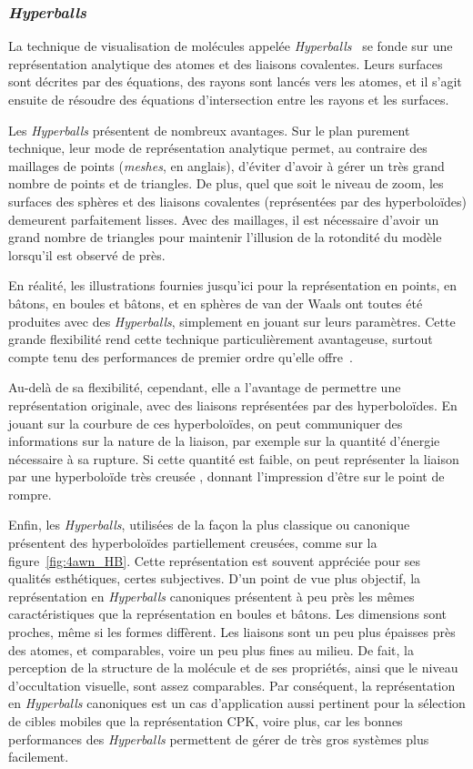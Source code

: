 \begin{appendices}
	\subsubsection{\emph{Hyperballs}} La technique de visualisation de molécules appelée \emph{Hyperballs}~\cite{chavent2011gpu} se fonde sur une représentation analytique des atomes et des liaisons covalentes. Leurs surfaces sont décrites par des équations, des rayons sont lancés vers les atomes, et il s'agit ensuite de résoudre des équations d'intersection entre les rayons et les surfaces.
		
	Les \emph{Hyperballs} présentent de nombreux avantages. Sur le plan purement technique, leur mode de représentation analytique permet, au contraire des maillages de points (\emph{meshes}, en anglais), d'éviter d'avoir à gérer un très grand nombre de points et de triangles. De plus, quel que soit le niveau de zoom, les surfaces des sphères et des liaisons covalentes (représentées par des hyperboloïdes) demeurent parfaitement lisses. Avec des maillages, il est nécessaire d'avoir un grand nombre de triangles pour maintenir l'illusion de la rotondité du modèle lorsqu'il est observé de près.
	
	En réalité, les illustrations fournies jusqu'ici pour la représentation en points, en bâtons, en boules et bâtons, et en sphères de van der Waals ont toutes été produites avec des \emph{Hyperballs}, simplement en jouant sur leurs paramètres. Cette grande flexibilité rend cette technique particulièrement avantageuse, surtout compte tenu des performances de premier ordre qu'elle offre~\cite{chavent2011gpu}.
		
	Au-delà de sa flexibilité, cependant, elle a l'avantage de permettre une représentation originale, avec des liaisons représentées par des hyperboloïdes. En jouant sur la courbure de ces hyperboloïdes, on peut communiquer des informations sur la nature de la liaison, par exemple sur la quantité d'énergie nécessaire à sa rupture. Si cette quantité est faible, on peut représenter la liaison par une hyperboloïde très \og creusée \fg{}, donnant l'impression d'être sur le point de rompre.
		
	Enfin, les \emph{Hyperballs}, utilisées de la façon la plus \og classique \fg{} ou \og canonique \fg{} présentent des hyperboloïdes partiellement creusées, comme sur la figure~\ref{fig:4awn_HB}. Cette représentation est souvent appréciée pour ses qualités esthétiques, certes subjectives. D'un point de vue plus objectif, la représentation en \emph{Hyperballs} canoniques présentent à peu près les mêmes caractéristiques que la représentation en boules et bâtons. Les dimensions sont proches, même si les formes diffèrent. Les liaisons sont un peu plus épaisses près des atomes, et comparables, voire un peu plus fines au milieu. De fait, la perception de la structure de la molécule et de ses propriétés, ainsi que le niveau d'occultation visuelle, sont assez comparables. Par conséquent, la représentation en \emph{Hyperballs} canoniques est un cas d'application aussi pertinent pour la sélection de cibles mobiles que la représentation CPK, voire plus, car les bonnes performances des \emph{Hyperballs} permettent de gérer de très gros systèmes plus facilement.
	

\end{appendices}
